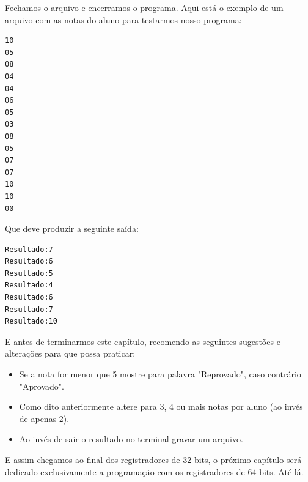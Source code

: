 Fechamos o arquivo e encerramos o programa. Aqui está o exemplo de um arquivo com as notas do aluno para testarmos nosso programa:
\begin{lstlisting}[]
10
05
08
04
04
06
05
03
08
05
07
07
10
10
00
\end{lstlisting}

Que deve produzir a seguinte saída:
\begin{lstlisting}[]
Resultado:7
Resultado:6
Resultado:5
Resultado:4
Resultado:6
Resultado:7
Resultado:10
\end{lstlisting}

E antes de terminarmos este capítulo, recomendo as seguintes sugestões e alterações para que possa praticar:
\begin{itemize}[nolistsep]
	\item Se a nota for menor que 5 mostre para palavra "Reprovado", caso contrário "Aprovado".
	\item Como dito anteriormente altere para 3, 4 ou mais notas por aluno (ao invés de apenas 2).
	\item Ao invés de sair o resultado no terminal gravar um arquivo.
\end{itemize}

E assim chegamos ao final dos registradores de 32 bits, o próximo capítulo será dedicado exclusivamente a programação com os registradores de 64 bits. Até lá.
\clearpage